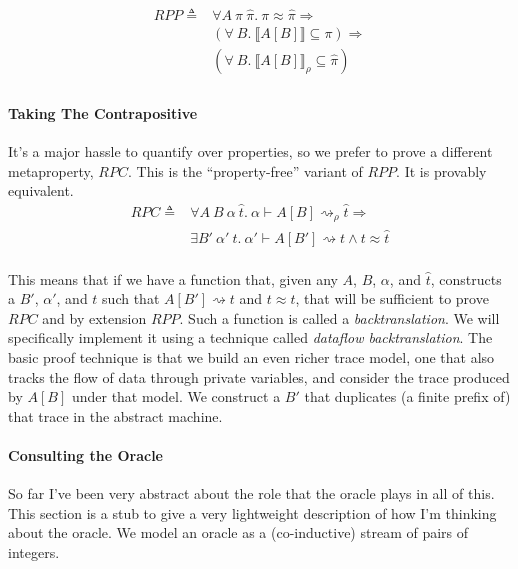 \documentclass{article}
\begin{document}
\[\begin{split}
\mathit{RPP} \triangleq & \forall A ~ \pi ~ \hat{\pi} . ~ \pi \approx \hat{\pi} \Rightarrow \\
& (\forall ~ B . ~ \llbracket A[B] \rrbracket \subseteq \pi) \Rightarrow \\
& (\forall ~ B . ~ \llbracket A[B] \rrbracket_\rho \subseteq \hat{\pi}) \\
\end{split}\]

\paragraph{Taking The Contrapositive}

It's a major hassle to quantify over properties, so we prefer to prove a different
metaproperty, \(\mathit{RPC}\). This is the ``property-free'' variant of \(\mathit{RPP}\).
It is provably equivalent.
%
\[\begin{split}
\mathit{RPC} \triangleq & \forall A ~ B ~ \alpha ~ \hat{t} . ~ \alpha \vdash A[B] \rightsquigarrow_\rho \hat{t} \Rightarrow \\
& \exists B' ~ \alpha' ~ t . ~ \alpha' \vdash A[B'] \rightsquigarrow t \land t \approx \hat{t} \\
\end{split}\]

This means that if we have a function that, given any \(A\), \(B\), \(\alpha\), and \(\hat{t}\),
constructs a \(B'\), \(\alpha'\), and \(t\) such that \(A[B'] \rightsquigarrow t\) and
\(t \approx \hat{t}\), that will be sufficient to prove \(\mathit{RPC}\) and by extension
\(\mathit{RPP}\). Such a function is called a {\em backtranslation}. We will specifically implement
it using a technique called {\em dataflow backtranslation}. The basic proof technique is that we build
an even richer trace model, one that also tracks the flow of data through private variables,
and consider the trace produced by \(A[B]\) under that model. We construct a \(B'\) that duplicates
(a finite prefix of) that trace in the abstract machine.

\paragraph{Consulting the Oracle}

So far I've been very abstract about the role that the oracle plays in all of this. 
This section is a stub to give a very lightweight description of how I'm thinking about the
oracle. We model an oracle as a (co-inductive) stream of pairs of integers.
\end{document}
